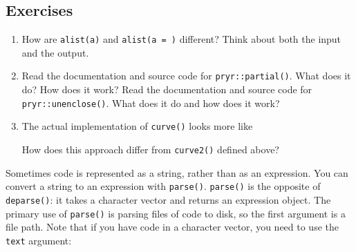 \subsection{Exercises}

\begin{enumerate}
\def\labelenumi{\arabic{enumi}.}
\item
  How are \texttt{alist(a)} and \texttt{alist(a = )} different? Think
  about both the input and the output.
\item
  Read the documentation and source code for \texttt{pryr::partial()}.
  What does it do? How does it work? Read the documentation and source
  code for \texttt{pryr::unenclose()}. What does it do and how does it
  work?
\item
  The actual implementation of \texttt{curve()} looks more like

\begin{Shaded}
\begin{Highlighting}[]
\StringTok{ } \NormalTok{(}\NormalTok{, }\NormalTok{), } \NormalTok{,}
                    \NormalTok{()) \{}
  \StringTok{ }\NormalTok{(} 
  \StringTok{ }\NormalTok{(xlim[}\NormalTok{], xlim[}\NormalTok{], } 

  \StringTok{ }\NormalTok{(}
   \NormalTok{, }
     \NormalTok{(}
\NormalTok{\}}
\end{Highlighting}
\end{Shaded}

  How does this approach differ from \texttt{curve2()} defined above?
\end{enumerate}


Sometimes code is represented as a string, rather than as an expression.
You can convert a string to an expression with \texttt{parse()}.
\texttt{parse()} is the opposite of \texttt{deparse()}: it takes a
character vector and returns an expression object. The primary use of
\texttt{parse()} is parsing files of code to disk, so the first argument
is a file path. Note that if you have code in a character vector, you
need to use the \texttt{text} argument: 

